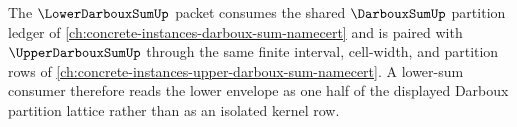 The $\LowerDarbouxSumUp$ packet consumes the shared $\DarbouxSumUp$ partition ledger of \autoref{ch:concrete-instances-darboux-sum-namecert} and is paired with $\UpperDarbouxSumUp$ through the same finite interval, cell-width, and partition rows of \autoref{ch:concrete-instances-upper-darboux-sum-namecert}. A lower-sum consumer therefore reads the lower envelope as one half of the displayed Darboux partition lattice rather than as an isolated kernel row.
